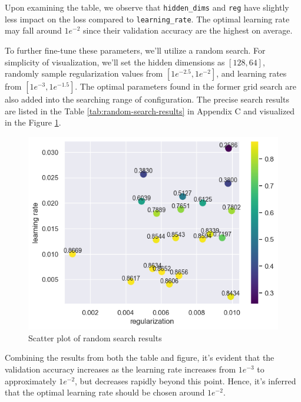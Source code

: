 \documentclass[10pt,a4paper,twoside]{tau}
\begin{document}
Upon examining the table, we observe that \texttt{hidden\_dims} and \texttt{reg} have slightly less impact on the loss compared to \texttt{learning\_rate}. The optimal learning rate may fall around $1e^{-2}$ since their validation accuracy are the highest on average.

To further fine-tune these parameters, we'll utilize a random search. For simplicity of visualization, we'll set the hidden dimensions as $[128, 64]$, randomly sample regularization values from $[1e^{-2.5}, 1e^{-2}]$, and learning rates from $[1e^{-3}, 1e^{-1.5}]$. The optimal parameters found in the former grid search are also added into the searching range of configuration. The precise search results are listed in the Table \ref{tab:random-search-results} in Appendix C and visualized in the Figure \ref{fig:random-search}.

\begin{figure}[htbp]
    \centering
    \includegraphics[scale=0.6]{images/random_search_scatter.png}
    \caption{Scatter plot of random search results}
    \label{fig:random-search}
\end{figure}

Combining the results from both the table and figure, it's evident that the validation accuracy increases as the learning rate increases from $1e^{-3}$ to approximately $1e^{-2}$, but decreases rapidly beyond this point. Hence, it's inferred that the optimal learning rate should be chosen around $1e^{-2}$.
\end{document}
